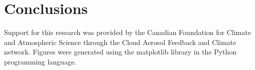 \documentclass[12pt]{article}
\begin{document}

\section{Conclusions}




\begin{acknowledgment}
Support for this research was provided by the Canadian Foundation for Climate 
and Atmospheric Science through the Cloud Aerosol Feedback and Climate 
network.  Figures were generated using the matplotlib library in the Python
programming language.
\end{acknowledgment}





\end{document}
